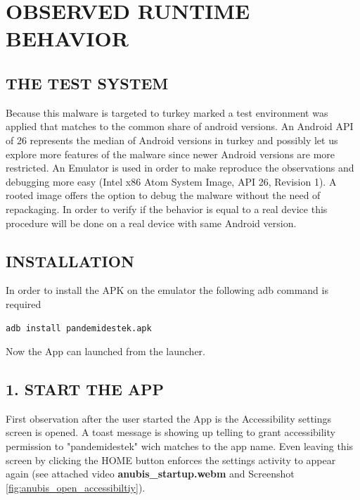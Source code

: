 \documentclass[10pt,titlepage]{article}
\begin{document}
\newpage
\section{OBSERVED RUNTIME BEHAVIOR} \label{runtimebehaviour}

\subsection{THE TEST SYSTEM}

Because this malware is targeted to turkey marked a test environment was applied that matches to the common share of android versions. An Android API of 26 represents the median of Android versions in turkey \cite{TURKEYANDROIDVERSIONS} and possibly let us explore more features of the malware since newer Android versions are more restricted. An Emulator is used in order to make reproduce the observations and debugging more easy (Intel x86 Atom System Image, API 26, Revision 1). A rooted image offers the option to debug the malware without the need of repackaging. In order to verify if the behavior is equal to a real device this procedure will be done on a real device with same Android version.


\subsection{INSTALLATION}
In order to install the APK on the emulator the following adb command is required

\begin{verbatim}
adb install pandemidestek.apk
\end{verbatim}

Now the App can launched from the launcher.


\subsection{1. START THE APP}
First observation after the user started the App is the Accessibility settings screen is opened. A toast message is showing up telling to grant accessibility permission to "pandemidestek" wich matches to the app name. Even leaving this screen by clicking the HOME button enforces the settings activity to appear again (see attached video \textbf{anubis\_startup.webm} and Screenshot \ref{fig:anubis_open_accessibiltiy}). 

\end{document}
